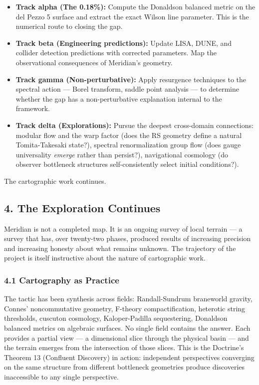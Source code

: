 \begin{itemize}[nosep,leftmargin=*]
  \item \textbf{Track alpha (The 0.18\%):} Compute the Donaldson balanced metric on the del Pezzo 5 surface and extract the exact Wilson line parameter. This is the numerical route to closing the gap.
  \item \textbf{Track beta (Engineering predictions):} Update LISA, DUNE, and collider detection predictions with corrected parameters. Map the observational consequences of Meridian's geometry.
  \item \textbf{Track gamma (Non-perturbative):} Apply resurgence techniques to the spectral action — Borel transform, saddle point analysis — to determine whether the gap has a non-perturbative explanation internal to the framework.
  \item \textbf{Track delta (Explorations):} Pursue the deepest cross-domain connections: modular flow and the warp factor (does the RS geometry define a natural Tomita-Takesaki state?), spectral renormalization group flow (does gauge universality \textit{emerge} rather than persist?), navigational cosmology (do observer bottleneck structures self-consistently select initial conditions?).
\end{itemize}


The cartographic work continues.


\bigskip\noindent\makebox[\textwidth]{\color{rulegray}\rule{5cm}{0.3pt}}\bigskip


\subsection*{4. The Exploration Continues}


Meridian is not a completed map. It is an ongoing survey of local terrain — a survey that has, over twenty-two phases, produced results of increasing precision and increasing honesty about what remains unknown. The trajectory of the project is itself instructive about the nature of cartographic work.


\subsubsection*{4.1 Cartography as Practice}


The tactic has been synthesis across fields: Randall-Sundrum braneworld gravity, Connes' noncommutative geometry, F-theory compactification, heterotic string thresholds, cuscuton cosmology, Kaloper-Padilla sequestering, Donaldson balanced metrics on algebraic surfaces. No single field contains the answer. Each provides a partial view — a dimensional slice through the physical basin — and the terrain emerges from the intersection of those slices. This is the Doctrine's Theorem 13 (Confluent Discovery) in action: independent perspectives converging on the same structure from different bottleneck geometries produce discoveries inaccessible to any single perspective.


